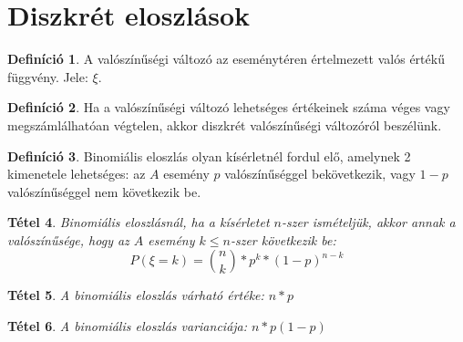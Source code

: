 \documentclass[twoside,12pt]{report}
\newtheorem{theorem}{Tétel}[section]
\theoremstyle{definition}
\newtheorem{definition}[theorem]{Definíció}
\begin{document}
\section{Diszkrét eloszlások}
	\begin{definition}
		A valószínűségi változó az eseménytéren értelmezett valós értékű függvény. Jele: $\xi$.
	\end{definition}
	\begin{definition}
		Ha a valószínűségi változó lehetséges értékeinek száma véges vagy megszámlálhatóan végtelen, akkor diszkrét valószínűségi változóról beszélünk.
	\end{definition}
	\begin{definition}
		Binomiális eloszlás olyan kísérletnél fordul elő, amelynek 2 kimenetele lehetséges: az $A$ esemény $p$ valószínűséggel bekövetkezik, vagy $1-p$ valószínűséggel nem következik be.
	\end{definition}
	\begin{theorem}
		Binomiális eloszlásnál, ha a kísérletet $n$-szer ismételjük, akkor annak a valószínűsége, hogy az $A$ esemény $k\le n$-szer következik be:
		\begin{equation*}
			P(\xi=k)=\binom{n}{k}*p^k*(1-p)^{n-k}
		\end{equation*}
	\end{theorem}
	\begin{theorem}
		A binomiális eloszlás várható értéke: $n*p$
	\end{theorem}
	\begin{theorem}
		A binomiális eloszlás varianciája: $n*p(1-p)$
	\end{theorem}
\end{document}
